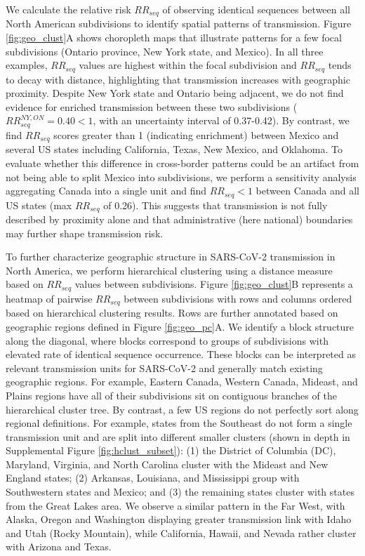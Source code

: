 \documentclass[11pt, letterpaper, oneside]{article}
\begin{document}
We calculate the relative risk $RR_{seq}$ of observing identical sequences between all North American subdivisions to identify spatial patterns of transmission.
Figure \ref{fig:geo_clust}A shows choropleth maps that illustrate patterns for a few focal subdivisions (Ontario province, New York state, and Mexico).
In all three examples, $RR_{seq}$ values are highest within the focal subdivision and $RR_{seq}$ tends to decay with distance, highlighting that transmission increases with geographic proximity.
Despite New York state and Ontario being adjacent, we do not find evidence for enriched transmission between these two subdivisions ($RR_{seq}^{NY,ON} = 0.40 < 1$, with an uncertainty interval of 0.37-0.42).
By contrast, we find $RR_{seq}$ scores greater than 1 (indicating enrichment) between Mexico and several US states including California, Texas, New Mexico, and Oklahoma.
To evaluate whether this difference in cross-border patterns could be an artifact from not being able to split Mexico into subdivisions, we perform a sensitivity analysis aggregating Canada into a single unit and find $RR_{seq} < 1$ between Canada and all US states (max $RR_{seq}$ of 0.26).
This suggests that transmission is not fully described by proximity alone and that administrative (here national) boundaries may further shape transmission risk.

To further characterize geographic structure in SARS-CoV-2 transmission in North America, we perform hierarchical clustering using a distance measure based on $RR_{seq}$ values between subdivisions.
Figure \ref{fig:geo_clust}B represents a heatmap of pairwise $RR_{seq}$ between subdivisions with rows and columns ordered based on hierarchical clustering results.
Rows are further annotated based on geographic regions defined in Figure \ref{fig:geo_pc}A.
We identify a block structure along the diagonal, where blocks correspond to groups of subdivisions with elevated rate of identical sequence occurrence.
These blocks can be interpreted as relevant transmission units for SARS-CoV-2 and generally match existing geographic regions.
For example, Eastern Canada, Western Canada, Mideast, and Plains regions have all of their subdivisions sit on contiguous branches of the hierarchical cluster tree.
By contrast, a few US regions do not perfectly sort along regional definitions.
For example, states from the Southeast do not form a single transmission unit and are split into different smaller clusters (shown in depth in Supplemental Figure \ref{fig:hclust_subset}):
(1) the District of Columbia (DC), Maryland, Virginia, and North Carolina cluster with the Mideast and New England states;
(2) Arkansas, Louisiana, and Mississippi group with Southwestern states and Mexico;
and (3) the remaining states cluster with states from the Great Lakes area.
We observe a similar pattern in the Far West, with Alaska, Oregon and Washington displaying greater transmission link with Idaho and Utah (Rocky Mountain), while California, Hawaii, and Nevada rather cluster with Arizona and Texas.
\end{document}
